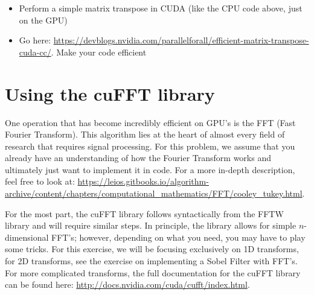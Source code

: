 \documentclass[11pt]{article}
\begin{document}
\begin{itemize}
\item Perform a simple matrix transpose in CUDA (like the CPU code above, just on the GPU)
\item Go here: \sloppy \url{https://devblogs.nvidia.com/parallelforall/efficient-matrix-transpose-cuda-cc/}. Make your code efficient
\end{itemize}

\newpage

\section*{Using the cuFFT library}

One operation that has become incredibly efficient on GPU's is the FFT (Fast Fourier Transform). This algorithm lies at the heart of almost every field of research that requires signal processing. For this problem, we assume that you already have an understanding of how the Fourier Transform works and ultimately just want to implement it in code. For a more in-depth description, feel free to look at: \url{https://leios.gitbooks.io/algorithm-archive/content/chapters/computational_mathematics/FFT/cooley_tukey.html}.

For the most part, the cuFFT library follows syntactically from the FFTW library and will require similar steps. In principle, the library allows for simple $n$-dimensional FFT's; however, depending on what you need, you may have to play some tricks. For this exercise, we will be focusing exclusively on 1D transforms, for 2D transforms, see the exercise on implementing a Sobel Filter with FFT's. For more complicated transforms, the full documentation for the cuFFT library can be found here: \url{http://docs.nvidia.com/cuda/cufft/index.html}.
\end{document}
